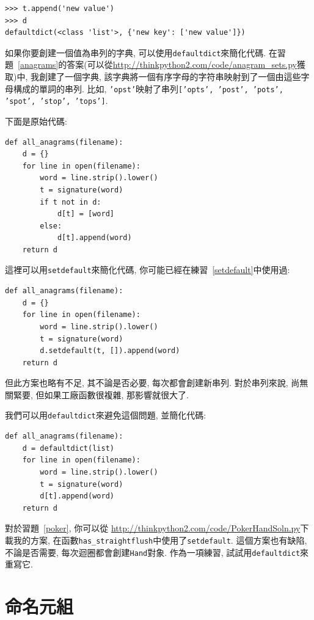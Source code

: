 \documentclass[10pt]{book}
\begin{document}
\begin{verbatim}
>>> t.append('new value')
>>> d
defaultdict(<class 'list'>, {'new key': ['new value']})
\end{verbatim}

如果你要創建一個值為串列的字典, 可以使用{\tt defaultdict}來簡化代碼. 
在習題~\ref{anagrams}的答案(可以從\url{http://thinkpython2.com/code/anagram_sets.py}獲取)中, 
我創建了一個字典, 該字典將一個有序字母的字符串映射到了一個由這些字母構成的單詞的串列. 
比如, {\tt 'opst'}映射了串列{\tt ['opts', 'post', 'pots', 'spot', 'stop', 'tops']}.

下面是原始代碼:

\begin{verbatim}
def all_anagrams(filename):
    d = {}
    for line in open(filename):
        word = line.strip().lower()
        t = signature(word)
        if t not in d:
            d[t] = [word]
        else:
            d[t].append(word)
    return d
\end{verbatim}

這裡可以用{\tt setdefault}來簡化代碼, 你可能已經在練習~\ref{setdefault}中使用過:

\begin{verbatim}
def all_anagrams(filename):
    d = {}
    for line in open(filename):
        word = line.strip().lower()
        t = signature(word)
        d.setdefault(t, []).append(word)
    return d
\end{verbatim}

但此方案也略有不足, 其不論是否必要, 每次都會創建新串列. 
對於串列來說, 尚無關緊要, 但如果工廠函數很複雜, 
那影響就很大了. 

我們可以用{\tt defaultdict}來避免這個問題, 並簡化代碼:

\begin{verbatim}
def all_anagrams(filename):
    d = defaultdict(list)
    for line in open(filename):
        word = line.strip().lower()
        t = signature(word)
        d[t].append(word)
    return d
\end{verbatim}

對於習題~\ref{poker}, 你可以從
\url{http://thinkpython2.com/code/PokerHandSoln.py}下載我的方案, 
在函數\verb"has_straightflush"中使用了{\tt setdefault}. 
這個方案也有缺陷, 不論是否需要, 每次迴圈都會創建{\tt Hand}對象. 
作為一項練習, 試試用{\tt defaultdict}來重寫它. 


\section{命名元組}
\label{Named tuples}
\end{document}
